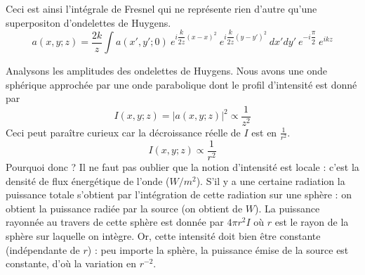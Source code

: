 Ceci est ainsi l'intégrale de Fresnel qui ne représente rien d'autre qu'une superpositon d'ondelettes 
de Huygens.
\begin{equation}
a(x,y;z) = \frac{2k}{z}\int a(x',y';0)\ e^{i\dfrac{k}{2z}(x-x)^2}\
 e^{i\dfrac{k}{2z}(y-y')^2}\ dx'dy'\ e^{-i\dfrac{\pi}{2}}\ e^{ikz}
\end{equation}


Analysons les amplitudes des ondelettes de Huygens. Nous avons une onde sphérique 
approchée par une onde parabolique dont le profil d'intensité est donné par
\begin{equation}
I(x,y;z) = |a(x,y;z)|^2 \propto \dfrac{1}{z^2}
\end{equation}
Ceci peut paraître curieux car la décroissance réelle de $I$ est en $\frac{1}{r^2}$.
\begin{equation}
I(x,y;z) \propto \frac{1}{r^2}
\end{equation}
Pourquoi donc ? Il ne faut pas oublier que la notion d'intensité est locale : c'est la 
densité de flux énergétique de l'onde ($W/m^2$). S'il y a une certaine radiation la puissance 
totale s'obtient par l'intégration de cette radiation sur une sphère : on obtient la 
puissance radiée par la source (on obtient de $W$). La puissance rayonnée au travers de cette 
sphère est donnée par $4\pi r^2 I$ où $r$ est le rayon de la sphère sur laquelle on intègre. 
Or, cette intensité doit bien être constante (indépendante de $r$) : peu importe la sphère, 
la puissance émise de la source est constante, d'où la variation en $r^{-2}$.\\

